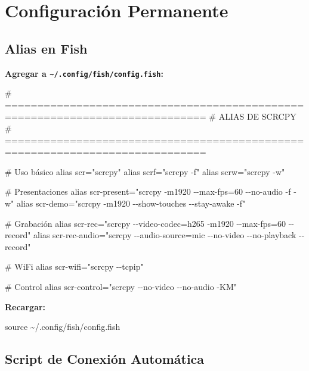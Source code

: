 \documentclass[
  doc,
  floatsintext,
  longtable,
  a4paper,
  nolmodern,
  notxfonts,
  notimes,
  12pt,
  colorlinks=true,linkcolor=blue,citecolor=blue,urlcolor=blue]{apa7}
\newenvironment{Shaded}{\begin{snugshade}}{\end{snugshade}}
\newcommand{\NormalTok}[1]{\textcolor[rgb]{0.00,0.23,0.31}{#1}}
\begin{document}
\section{Configuración Permanente}\label{configuraciuxf3n-permanente}

\subsection{Alias en Fish}\label{alias-en-fish}

\textbf{Agregar a \texttt{\textasciitilde{}/.config/fish/config.fish}:}

\begin{Shaded}
\begin{Highlighting}[]
\NormalTok{\# =============================================================================}
\NormalTok{\# ALIAS DE SCRCPY}
\NormalTok{\# =============================================================================}

\NormalTok{\# Uso básico}
\NormalTok{alias scr="scrcpy"}
\NormalTok{alias scrf="scrcpy {-}f"}
\NormalTok{alias scrw="scrcpy {-}w"}

\NormalTok{\# Presentaciones}
\NormalTok{alias scr{-}present="scrcpy {-}m1920 {-}{-}max{-}fps=60 {-}{-}no{-}audio {-}f {-}w"}
\NormalTok{alias scr{-}demo="scrcpy {-}m1920 {-}{-}show{-}touches {-}{-}stay{-}awake {-}f"}

\NormalTok{\# Grabación}
\NormalTok{alias scr{-}rec="scrcpy {-}{-}video{-}codec=h265 {-}m1920 {-}{-}max{-}fps=60 {-}{-}record"}
\NormalTok{alias scr{-}rec{-}audio="scrcpy {-}{-}audio{-}source=mic {-}{-}no{-}video {-}{-}no{-}playback {-}{-}record"}

\NormalTok{\# WiFi}
\NormalTok{alias scr{-}wifi="scrcpy {-}{-}tcpip"}

\NormalTok{\# Control}
\NormalTok{alias scr{-}control="scrcpy {-}{-}no{-}video {-}{-}no{-}audio {-}KM"}
\end{Highlighting}
\end{Shaded}

\textbf{Recargar:}

\begin{Shaded}
\begin{Highlighting}[]
\NormalTok{source \textasciitilde{}/.config/fish/config.fish}
\end{Highlighting}
\end{Shaded}

\subsection{Script de Conexión
Automática}\label{script-de-conexiuxf3n-automuxe1tica}
\end{document}
